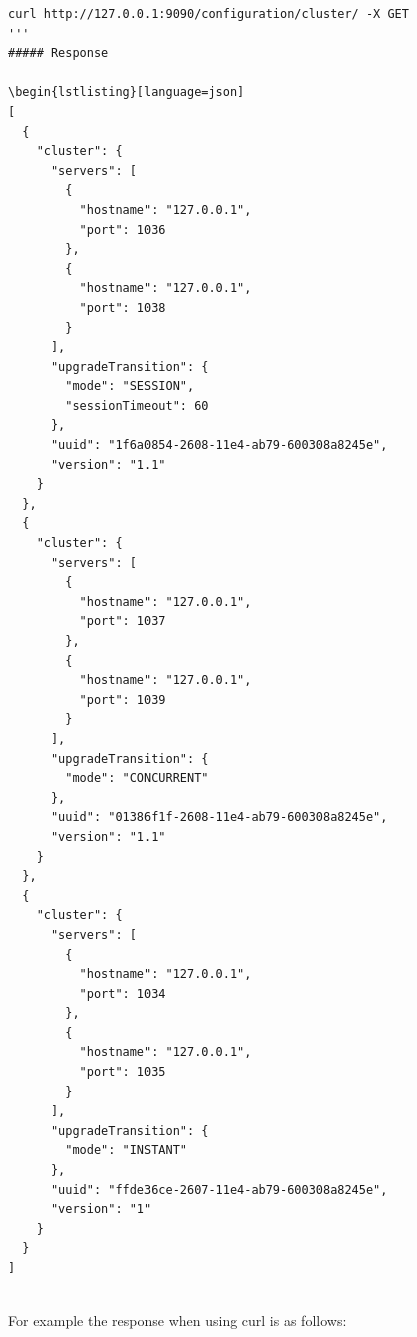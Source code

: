 \documentclass[a4paper,11pt,twoside]{report}
\begin{document}
\begin{lstlisting}[language=terminal]
curl http://127.0.0.1:9090/configuration/cluster/ -X GET
'''
##### Response

\begin{lstlisting}[language=json]
[
  {
    "cluster": {
      "servers": [
        {
          "hostname": "127.0.0.1", 
          "port": 1036
        }, 
        {
          "hostname": "127.0.0.1", 
          "port": 1038
        }
      ], 
      "upgradeTransition": {
        "mode": "SESSION", 
        "sessionTimeout": 60
      }, 
      "uuid": "1f6a0854-2608-11e4-ab79-600308a8245e", 
      "version": "1.1"
    }
  }, 
  {
    "cluster": {
      "servers": [
        {
          "hostname": "127.0.0.1", 
          "port": 1037
        }, 
        {
          "hostname": "127.0.0.1", 
          "port": 1039
        }
      ], 
      "upgradeTransition": {
        "mode": "CONCURRENT"
      }, 
      "uuid": "01386f1f-2608-11e4-ab79-600308a8245e", 
      "version": "1.1"
    }
  }, 
  {
    "cluster": {
      "servers": [
        {
          "hostname": "127.0.0.1", 
          "port": 1034
        }, 
        {
          "hostname": "127.0.0.1", 
          "port": 1035
        }
      ], 
      "upgradeTransition": {
        "mode": "INSTANT"
      }, 
      "uuid": "ffde36ce-2607-11e4-ab79-600308a8245e", 
      "version": "1"
    }
  }
]
\end{lstlisting}

\noindent \\
For example the response when using curl is as follows:\bigskip
\end{document}
